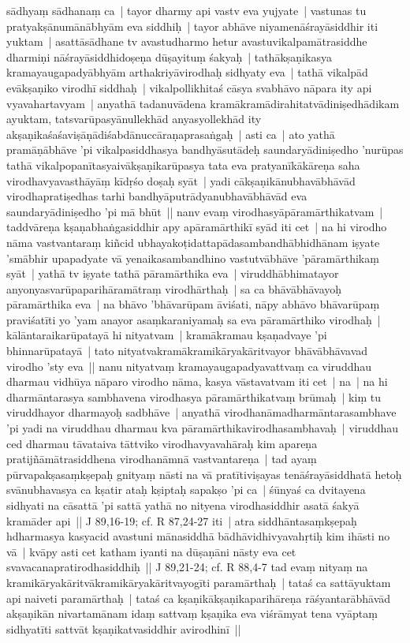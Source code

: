 \documentclass[article,12pt,a4paper]{memoir}%
\begin{document}
sādhyaṃ sādhanaṃ ca | tayor dharmy api vastv eva yujyate | \label{thakur75-93.19} vastunas tu pratyakṣānumānābhyām eva siddhiḥ | tayor abhāve niyamenāśrayāsiddhir iti yuktam | asattāsādhane tv avastudharmo hetur avastuvikalpamātrasiddhe dharmiṇi nāśrayāsiddhidoṣeṇa dūṣayituṃ śakyaḥ | tathākṣaṇikasya kramayaugapadyābhyām arthakriyāvirodhaḥ sidhyaty eva | \label{thakur75-93.22} tathā vikalpād evākṣaṇiko virodhī siddhaḥ | vikalpollikhitaś cāsya svabhāvo nāpara ity api vyavahartavyam | anyathā tadanuvādena kramākramādirahitatvādiniṣedhādikam ayuktam, tatsvarūpasyānullekhād anyasyollekhād ity akṣaṇikaśaśaviṣāṇādiśabdānuccāraṇaprasaṅgaḥ | asti ca | ato yathā pramāṇābhāve 'pi vikalpasiddhasya bandhyāsutādeḥ saundaryādiniṣedho 'nurūpas tathā vikalpopanītasyaivākṣaṇikarūpasya tata eva pratyanīkākāreṇa saha virodhavyavasthāyāṃ kīdṛśo doṣaḥ syāt | yadi cākṣaṇikānubhavābhāvād virodhapratiṣedhas tarhi bandhyāputrādyanubhavābhāvād eva saundaryādiniṣedho 'pi mā bhūt || \label{thakur75-94.5} nanv evaṃ virodhasyāpāramārthikatvam | taddvāreṇa kṣaṇabhaṅgasiddhir apy apāramārthikī syād iti cet | \label{thakur75-94.6} na hi virodho nāma vastvantaraṃ kiñcid ubhayakoṭidattapādasambandhābhidhānam iṣyate 'smābhir upapadyate vā yenaikasambandhino vastutvābhāve 'pāramārthikaṃ syāt | yathā tv iṣyate tathā pāramārthika eva | viruddhābhimatayor anyonyasvarūpaparihāramātraṃ virodhārthaḥ | sa ca bhāvābhāvayoḥ pāramārthika eva | na bhāvo 'bhāvarūpam āviśati, nāpy abhāvo bhāvarūpaṃ praviśatīti yo 'yam anayor asaṃkaraniyamaḥ sa eva pāramārthiko virodhaḥ | kālāntaraikarūpatayā hi nityatvam | kramākramau kṣaṇadvaye 'pi bhinnarūpatayā | tato nityatvakramākramikāryakāritvayor bhāvābhāvavad virodho 'sty eva || \label{thakur75-94.14} nanu nityatvaṃ kramayaugapadyavattvaṃ ca viruddhau dharmau vidhūya nāparo virodho nāma, kasya vāstavatvam iti cet | \label{thakur75-94.15} na | na hi dharmāntarasya sambhavena virodhasya pāramārthikatvaṃ brūmaḥ | kiṃ tu viruddhayor dharmayoḥ sadbhāve | anyathā virodhanāmadharmāntarasambhave 'pi yadi na viruddhau dharmau kva pāramārthikavirodhasambhavaḥ | viruddhau ced dharmau tāvataiva tāttviko virodhavyavahāraḥ kim apareṇa pratijñāmātrasiddhena virodhanāmnā vastvantareṇa | \label{thakur75-94.20} tad ayaṃ pūrvapakṣasaṃkṣepaḥ gnityaṃ nāsti na vā pratītiviṣayas tenāśrayāsiddhatā hetoḥ svānubhavasya ca kṣatir ataḥ kṣiptaḥ sapakṣo 'pi ca | śūnyaś ca dvitayena sidhyati na cāsattā 'pi sattā yathā no nityena virodhasiddhir asatā śakyā kramāder api || J 89,16-19; cf. R 87,24-27 iti | \label{thakur75-94.25} atra siddhāntasaṃkṣepaḥ hdharmasya kasyacid avastuni mānasiddhā bādhāvidhivyavahṛtiḥ kim ihāsti no vā | kvāpy asti cet katham iyanti na dūṣaṇāni nāsty eva cet svavacanapratirodhasiddhiḥ || J 89,21-24; cf. R 88,4-7 \label{thakur75-95.1} tad evaṃ nityaṃ na kramikāryakāritvākramikāryakāritvayogīti paramārthaḥ | tataś ca sattāyuktam api naiveti paramārthaḥ | tataś ca kṣaṇikākṣaṇikaparihāreṇa rāśyantarābhāvād akṣaṇikān nivartamānam idaṃ sattvaṃ kṣaṇika eva viśrāmyat tena vyāptaṃ sidhyatīti sattvāt kṣaṇikatvasiddhir avirodhinī ||
\end{document}
